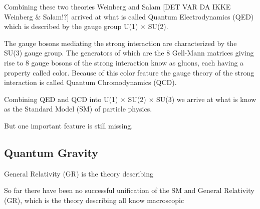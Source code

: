 Combining these two theories Weinberg and Salam [DET VAR DA IKKE Weinberg \& Salam!?] arrived at what is called Quantum Electrodynamics (QED) which is described by the gauge group U(1) $\times$ SU(2).

The gauge bosons mediating the strong interaction are characterized by the SU(3) gauge group. The generators of which are the 8 Gell-Mann matrices giving rise to 8 gauge bosons of the strong interaction know as gluons, each having a property called color. Because of this color feature the gauge theory of the strong interaction is called Quantum Chromodynamics (QCD).

Combining QED and QCD into U(1) $\times$ SU(2) $\times$ SU(3) we arrive at what is know as the Standard Model (SM) of particle physics.

But one important feature is still missing.

\subsection{Quantum Gravity}
General Relativity (GR) is the theory describing


So far there have been no successful unification of the SM and General Relativity (GR), which is the theory describing all know macroscopic